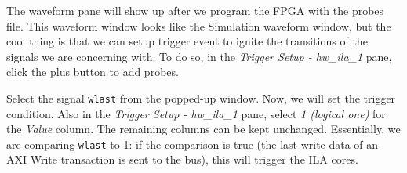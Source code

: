 \documentclass[11pt]{article}
\begin{document}
\begin{appendices}
\begin{center}
\end{center}

The waveform pane will show up after we program the FPGA with the probes file. This waveform window looks like the Simulation waveform window, but the cool thing is that we can setup trigger event to ignite the transitions of the signals we are concerning with. To do so, in the \emph{Trigger Setup - hw\_ila\_1} pane, click the plus button to add probes.

\begin{center}
\end{center}

Select the signal \verb|wlast| from the popped-up window. Now, we will set the trigger condition. Also in the \emph{Trigger Setup - hw\_ila\_1} pane, select \emph{1 (logical one)} for the \emph{Value} column. The remaining columns can be kept unchanged. Essentially, we are comparing \verb|wlast| to 1: if the comparison is true (the last write data of an AXI Write transaction is sent to the bus), this will trigger the ILA cores.


\end{appendices}
\end{document}
